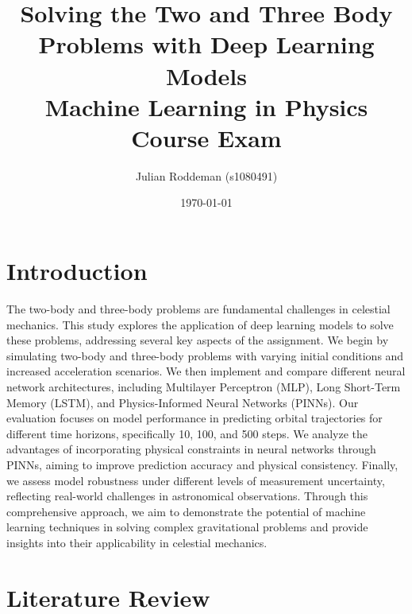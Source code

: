 \documentclass[11pt,a4paper, twocolumn]{article}
\title{Solving the Two and Three Body Problems with Deep Learning Models \\
  \large Machine Learning in Physics Course Exam}
\author{Julian Roddeman (s1080491)}
\date{\today}
\begin{document}
  \section{Introduction}
  \label{sec:introduction}
  The two-body and three-body problems are fundamental challenges in celestial mechanics. This study explores the application of deep learning models to solve these problems, addressing several key aspects of the assignment. We begin by simulating two-body and three-body problems with varying initial conditions and increased acceleration scenarios. We then implement and compare different neural network architectures, including Multilayer Perceptron (MLP), Long Short-Term Memory (LSTM), and Physics-Informed Neural Networks (PINNs). Our evaluation focuses on model performance in predicting orbital trajectories for different time horizons, specifically 10, 100, and 500 steps. We analyze the advantages of incorporating physical constraints in neural networks through PINNs, aiming to improve prediction accuracy and physical consistency. Finally, we assess model robustness under different levels of measurement uncertainty, reflecting real-world challenges in astronomical observations. Through this comprehensive approach, we aim to demonstrate the potential of machine learning techniques in solving complex gravitational problems and provide insights into their applicability in celestial mechanics.

\section{Literature Review}
\label{sec:literature}
\end{document}
